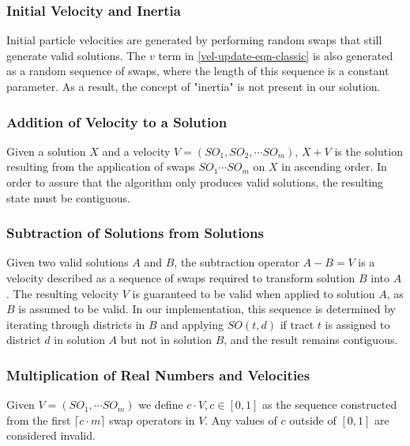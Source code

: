 \documentclass[journal]{IEEEtran}
\begin{document}
\subsubsection{Initial Velocity and Inertia}
Initial particle velocities are generated by performing random swaps that still
generate valid solutions.  The $v$ term in \ref{vel-update-eqn-classic} is also
generated as a random sequence of swaps, where the length of this sequence is a
constant parameter.  As a result, the concept of "inertia" is not present in our
solution.\\

\subsubsection{Addition of Velocity to a Solution}
Given a solution $X$ and a velocity $V = (SO_1, SO_2, \cdots SO_m)$, $X + V$ is
the solution resulting from the application of swaps $SO_1 \cdots SO_m$ on $X$
in ascending order.  In order to assure that the algorithm only produces valid
solutions, the resulting state must be contiguous.\\

\subsubsection{Subtraction of Solutions from Solutions}
Given two valid solutions $A$ and $B$, the subtraction operator $A - B = V$ is a
velocity described as a sequence of swaps required to transform solution $B$
into $A$.  The resulting velocity $V$ is guaranteed to be valid when applied to
solution $A$, as $B$ is assumed to be valid.  In our implementation, this
sequence is determined by iterating through districts in $B$ and applying $SO(t,
d)$ if tract $t$ is assigned to district $d$ in solution $A$ but not in solution
$B$, and the result remains contiguous.\\

\subsubsection{Multiplication of Real Numbers and Velocities}
Given $V = (SO_1, \cdots SO_m)$ we define $c \cdot V, c \in [0, 1]$ as the
sequence constructed from the first $\lceil c\cdot m \rceil$ swap operators in
$V$.  Any values of $c$ outside of $[0, 1]$ are considered invalid.\\
\end{document}

